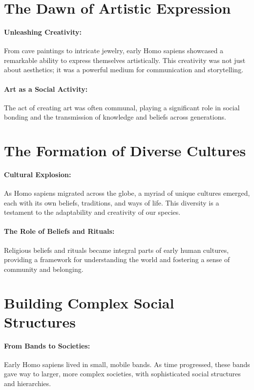 \documentclass[a4paper,12pt]{book}
\begin{document}
\section*{The Dawn of Artistic Expression}

\paragraph{Unleashing Creativity:}
From cave paintings to intricate jewelry, early Homo sapiens showcased a remarkable ability to express themselves artistically. This creativity was not just about aesthetics; it was a powerful medium for communication and storytelling.

\paragraph{Art as a Social Activity:}
The act of creating art was often communal, playing a significant role in social bonding and the transmission of knowledge and beliefs across generations.

\section*{The Formation of Diverse Cultures}

\paragraph{Cultural Explosion:}
As Homo sapiens migrated across the globe, a myriad of unique cultures emerged, each with its own beliefs, traditions, and ways of life. This diversity is a testament to the adaptability and creativity of our species.

\paragraph{The Role of Beliefs and Rituals:}
Religious beliefs and rituals became integral parts of early human cultures, providing a framework for understanding the world and fostering a sense of community and belonging.

\section*{Building Complex Social Structures}

\paragraph{From Bands to Societies:}
Early Homo sapiens lived in small, mobile bands. As time progressed, these bands gave way to larger, more complex societies, with sophisticated social structures and hierarchies.
\end{document}
